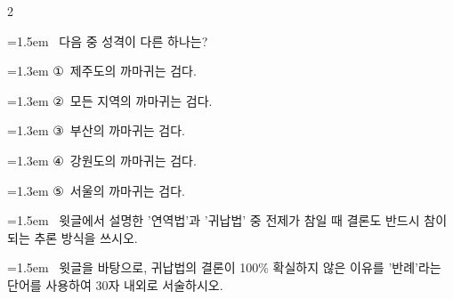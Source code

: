\documentclass[10pt, a4paper]{article}
\begin{document}
\begin{multicols}{2}
\noindent\begin{minipage}{\columnwidth}
\vspace{2mm}
{\hangindent=1.5em  ~다음 중 성격이 다른 하나는?\par}

\vspace{0.5mm}
{\hangindent=1.3em  \noindent\hspace{0.3em}①~제주도의 까마귀는 검다.\par}
{\hangindent=1.3em  \noindent\hspace{0.3em}②~모든 지역의 까마귀는 검다.\par}
{\hangindent=1.3em  \noindent\hspace{0.3em}③~부산의 까마귀는 검다.\par}
{\hangindent=1.3em  \noindent\hspace{0.3em}④~강원도의 까마귀는 검다.\par}
{\hangindent=1.3em  \noindent\hspace{0.3em}⑤~서울의 까마귀는 검다.\par}
\vspace{4mm}
\end{minipage}
\par

\noindent\begin{minipage}{\columnwidth}
\vspace{2mm}
{\hangindent=1.5em  ~윗글에서 설명한 '연역법'과 '귀납법' 중 전제가 참일 때 결론도 반드시 참이 되는 추론 방식을 쓰시오.\par}

\vspace{3mm}
\noindent\hrulefill
\vspace{2.5mm}
\noindent\hrulefill
\vspace{2.5mm}
\noindent\hrulefill
\vspace{2.5mm}
\noindent\hrulefill
\vspace{2.5mm}
\noindent\hrulefill
\vspace{2.5mm}
\vspace{1mm}
\vspace{4mm}
\end{minipage}
\par

\noindent\begin{minipage}{\columnwidth}
\vspace{2mm}
{\hangindent=1.5em  ~윗글을 바탕으로, 귀납법의 결론이 100\% 확실하지 않은 이유를 '반례'라는 단어를 사용하여 30자 내외로 서술하시오.\par}


\end{minipage}
\end{multicols}
\end{document}
